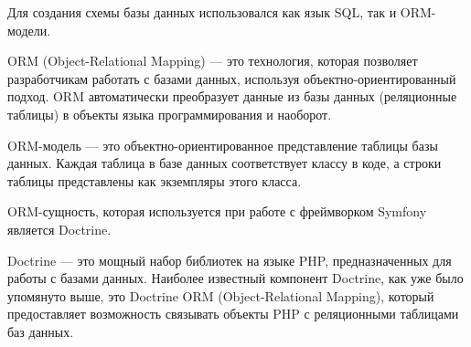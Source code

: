 \documentclass[pract]{SCWorks}
\begin{document}




Для создания схемы базы данных использовался как язык SQL, так и ORM-модели.

ORM (Object-Relational Mapping) — это технология, которая позволяет 
разработчикам работать с базами данных, используя объектно-ориентированный 
подход. ORM автоматически преобразует данные из базы данных (реляционные 
таблицы) в объекты языка программирования и наоборот.

ORM-модель — это объектно-ориентированное представление таблицы базы данных. 
Каждая таблица в базе данных соответствует классу в коде, а строки таблицы 
представлены как экземпляры этого класса.

ORM-сущность, которая используется при работе с фреймворком Symfony является
Doctrine.

Doctrine — это мощный набор библиотек на языке PHP, предназначенных для 
работы с базами данных. Наиболее известный компонент Doctrine, как уже было
упомянуто выше, это Doctrine ORM (Object-Relational Mapping), который 
предоставляет возможность связывать объекты PHP с реляционными таблицами 
баз данных.
\end{document}
